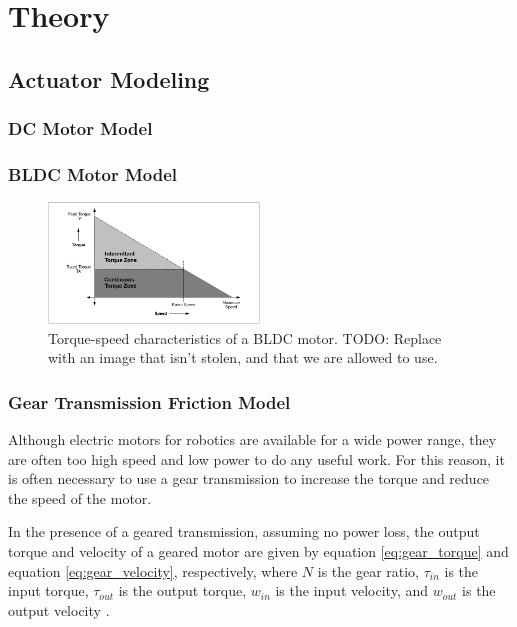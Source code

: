 \section{Theory}

\subsection{Actuator Modeling}
    \subsubsection{DC Motor Model}



    \subsubsection{BLDC Motor Model}


    \begin{figure}[H]
        \centering
        \includegraphics[width=0.5\textwidth]{Images/stolen_BLDC_torque_speed.png}
        \caption{Torque-speed characteristics of a BLDC motor. TODO: Replace with an image that isn't stolen, and that we are allowed to use. }
        \label{fig:bldc_torque_speed}
    \end{figure}

    \subsubsection{Gear Transmission Friction Model}

    Although electric motors for robotics are available for a wide power range, they are often too high speed and low power to do any useful work. For this reason, it is often necessary to use a gear transmission to increase the torque and reduce the speed of the motor. 

    In the presence of a geared transmission, assuming no power loss, the output torque and velocity of a geared motor are given by equation \ref{eq:gear_torque} and equation \ref{eq:gear_velocity}, respectively, where $N$ is the gear ratio, $\tau_{in}$ is the input torque, $\tau_{out}$ is the output torque, $w_{in}$ is the input velocity, and $w_{out}$ is the output velocity \cite{modern_robotics_book}.

